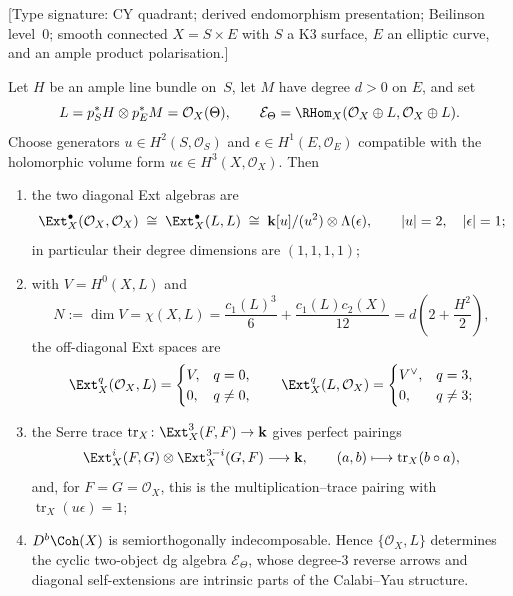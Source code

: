 \begin{proposition}
\label{prop:hochcalc-kuznetsov-k3xE-phi3}
\textup{[Type signature: CY quadrant; derived endomorphism
presentation; Beilinson level~$0$; smooth connected
$X=S\times E$ with $S$ a K3 surface, $E$ an elliptic curve, and an
ample product polarisation.]}

Let $H$ be an ample line bundle on~$S$, let $M$ have degree $d>0$ on
$E$, and set
\[
 L=p_S^*H\otimes p_E^*M=\mathcal O_X(\Theta),
 \qquad
 \mathcal E_\Theta=\RHom_X(\mathcal O_X\oplus L,
                                  \mathcal O_X\oplus L).
\]
Choose generators $u\in H^2(S,\mathcal O_S)$ and
$\epsilon\in H^1(E,\mathcal O_E)$ compatible with the holomorphic
volume form $u\epsilon\in H^3(X,\mathcal O_X)$.  Then
\begin{enumerate}[label=\textup{(\roman*)}]
\item the two diagonal Ext algebras are
\begin{equation}
\label{eq:hochcalc-k3e-self-ext-algebra}
 \Ext_X^\bullet(\mathcal O_X,\mathcal O_X)
 \;\cong\;
 \Ext_X^\bullet(L,L)
 \;\cong\;
 \mathbf k[u]/(u^2)\otimes\Lambda(\epsilon),
 \qquad |u|=2,\quad |\epsilon|=1;
\end{equation}
in particular their degree dimensions are $(1,1,1,1)$;
\item with $V=H^0(X,L)$ and
\begin{equation}
\label{eq:hochcalc-k3e-product-polarisation-rank}
 N:=\dim V
 =\chi(X,L)
 =\frac{c_1(L)^3}{6}+\frac{c_1(L)c_2(X)}{12}
 =d\!\left(2+\frac{H^2}{2}\right),
\end{equation}
the off-diagonal Ext spaces are
\begin{equation}
\label{eq:hochcalc-k3e-cross-ext-algebra}
 \Ext_X^q(\mathcal O_X,L)=
 \begin{cases}V,&q=0,\\0,&q\ne0,
 \end{cases}
 \qquad
 \Ext_X^q(L,\mathcal O_X)=
 \begin{cases}V^\vee,&q=3,\\0,&q\ne3;
 \end{cases}
\end{equation}
\item the Serre trace
$\operatorname{tr}_X\colon\Ext_X^3(F,F)\to\mathbf k$ gives perfect
pairings
\begin{equation}
\label{eq:hochcalc-k3e-serre-pairings}
 \Ext_X^i(F,G)\otimes\Ext_X^{3-i}(G,F)
 \longrightarrow\mathbf k,
 \qquad (a,b)\longmapsto\operatorname{tr}_X(b\circ a),
\end{equation}
and, for $F=G=\mathcal O_X$, this is the multiplication--trace
pairing with $\operatorname{tr}_X(u\epsilon)=1$;
\item $D^b\Coh(X)$ is semiorthogonally indecomposable.  Hence
$\{\mathcal O_X,L\}$ determines the cyclic two-object dg algebra
$\mathcal E_\Theta$, whose degree-$3$ reverse arrows and diagonal
self-extensions are intrinsic parts of the Calabi--Yau structure.
\end{enumerate}
\end{proposition}

